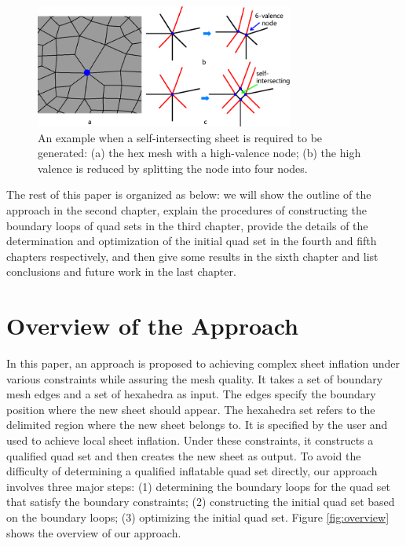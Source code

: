 \documentclass[final,5p,times,twocolumn]{elsarticle}
\begin{document}
\begin{figure}[htbp]
\begin{center}
\includegraphics[width=8.5cm]{intro_int_required.png}
\caption{An example when a self-intersecting sheet is required to be generated: (a) the hex mesh with a high-valence node; (b) the high valence is reduced by splitting the node into four nodes.}
\label{fig:intro_int_required}
\end{center}
\end{figure}

The rest of this paper is organized as below: we will show the outline of the approach in the second chapter, explain the procedures of constructing the boundary loops of quad sets in the third chapter, provide the details of the determination and optimization of the initial quad set in the fourth and fifth chapters respectively, and then give some results in the sixth chapter and list conclusions and future work in the last chapter.

\section{Overview of the Approach}
\label{sec:algo_overview}

In this paper, an approach is proposed to achieving complex sheet inflation under various constraints while assuring the mesh quality. It takes a set of boundary mesh edges and a set of hexahedra as input. The edges specify the boundary position where the new sheet should appear. The hexahedra set refers to the delimited region where the new sheet belongs to. It is specified by the user and used to achieve local sheet inflation. Under these constraints, it constructs a qualified quad set and then creates the new sheet as output. To avoid the difficulty of determining a qualified inflatable quad set directly, our approach involves three major steps: (1) determining the boundary loops for the quad set that satisfy the boundary constraints; (2) constructing the initial quad set based on the boundary loops; (3) optimizing the initial quad set. Figure \ref{fig:overview} shows the overview of our approach.
\end{document}
